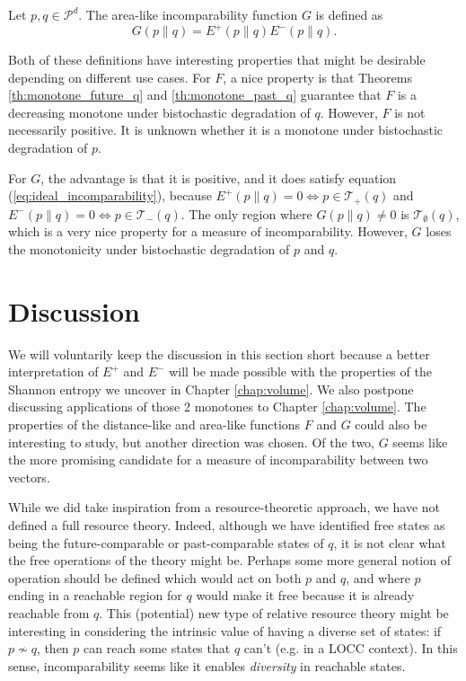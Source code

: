 \begin{definition} \label{def:area-like_function}
    Let $p, q \in \mathcal{P}^d$. The area-like incomparability function $G$ is defined as 
    \begin{equation}
        G(p \parallel q) = E^+(p \parallel q) E^-(p \parallel q).
    \end{equation}
\end{definition}

Both of these definitions have interesting properties that might be desirable depending on different use cases. For $F$, a nice property is that Theorems \ref{th:monotone_future_q} and \ref{th:monotone_past_q} guarantee that $F$ is a decreasing monotone under bistochastic degradation of $q$. However, $F$ is not necessarily positive. It is unknown whether it is a monotone under bistochastic degradation of $p$.

For $G$, the advantage is that it is positive, and it does satisfy equation (\ref{eq:ideal_incomparability}), because $E^+(p \parallel q) = 0 \iff p \in \mathcal{T}_+(q)$ and $E^-(p \parallel q) = 0 \iff p \in \mathcal{T}_-(q)$. The only region where $G(p \parallel q) \neq 0$ is $\mathcal{T}_\emptyset(q)$, which is a very nice property for a measure of incomparability. However, $G$ loses the monotonicity under bistochastic degradation of $p$ and $q$.



\section{Discussion}

We will voluntarily keep the discussion in this section short because a better interpretation of $E^+$ and $E^-$ will be made possible with the properties of the Shannon entropy we uncover in Chapter \ref{chap:volume}. We also postpone discussing applications of those 2 monotones to Chapter \ref{chap:volume}. The properties of the distance-like and area-like functions $F$ and $G$ could also be interesting to study, but another direction was chosen. Of the two, $G$ seems like the more promising candidate for a measure of incomparability between two vectors.

While we did take inspiration from a resource-theoretic approach, we have not defined a full resource theory. Indeed, although we have identified free states as being the future-comparable or past-comparable states of $q$, it is not clear what the free operations of the theory might be. Perhaps some more general notion of operation should be defined which would act on both $p$ and $q$, and where $p$ ending in a reachable region for $q$ would make it free because it is already reachable from $q$. This (potential) new type of relative resource theory might be interesting in considering the intrinsic value of having a diverse set of states: if $p \nsim q$, then $p$ can reach some states that $q$ can't (e.g. in a LOCC context). In this sense, incomparability seems like it enables \textit{diversity} in reachable states.

